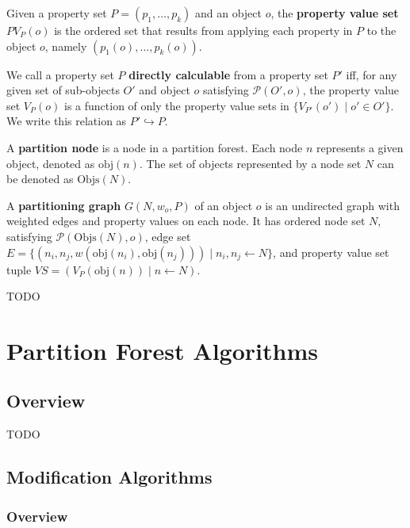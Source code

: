 \begin{definition}
Given a property set $P = (p_1,\ldots,p_k)$ and an object $o$, the \textbf{property value set} $PV_P(o)$ is the ordered set that results from applying each property in $P$ to the object $o$, namely $(p_1(o),\ldots,p_k(o))$.
\end{definition}

\begin{definition}
We call a property set $P$ \textbf{directly calculable} from a property set $P'$ iff, for any given set of sub-objects $O'$ and object $o$ satisfying $\mathcal{P}(O',o)$, the property value set $V_P(o)$ is a function of only the property value sets in $\{V_{P'}(o') \; | \; o' \in O'\}$. We write this relation as $P' \hookrightarrow P$.
\end{definition}

\begin{definition}
A \textbf{partition node} is a node in a partition forest. Each node $n$ represents a given object, denoted as $\mbox{obj}(n)$. The set of objects represented by a node set $N$ can be denoted as $\mbox{Objs}(N)$.
\end{definition}

\begin{definition}
A \textbf{partitioning graph} $G(N,w_o,P)$ of an object $o$ is an undirected graph with weighted edges and property values on each node. It has ordered node set $N$, satisfying $\mathcal{P}(\mbox{Objs}(N),o)$, edge set $E = \{(n_i,n_j,w(\mbox{obj}(n_i),\mbox{obj}(n_j))) \; | \; n_i, n_j \leftarrow N\}$, and property value set tuple $VS = (V_P(\mbox{obj}(n)) \; | \; n \leftarrow N)$.
\end{definition}

TODO

\section{Partition Forest Algorithms}

\subsection{Overview}

TODO

\subsection{Modification Algorithms}

\subsubsection{Overview}


